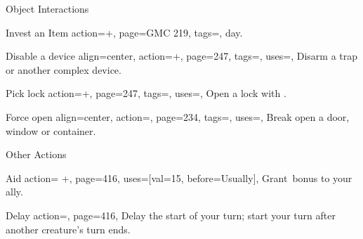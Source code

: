 \begin{PageBack}
\begin{Tables}{\backTableHeight}
\begin{Table}{Object Interactions}
\begin{entry}{Invest an Item}{%
                action=+,
                page=GMC 219,
                tags=\Manipulate,
            }
{                day.}
            \end{entry}
            \breakLine
            \begin{entry}{Disable a device}{%
                align=center,
                action=+,
                page=247,
                tags=\Manipulate,
                uses={\Thievery[tags={T}]},
            }
                Disarm a trap or another complex device. \hfill {}\\
                \hfill {}
            \end{entry}
            \begin{entry}{Pick lock}{%
                action=+,
                page=247,
                tags=\Manipulate,
                uses={\Thievery[tags={T}]},
            }
                Open a lock with . \hfill{}\; 
            \end{entry}
            \begin{entry}{Force open}{%
                align=center,
                action=,
                page=234,
                tags=\Attack,
                uses=\Athletics,
            }
                Break open a door, window or container. \hfill{}\\
                \hfill{}
            \end{entry}
        \end{Table}%
        \TableSpace
        \begin{Table}{Other Actions}
            \begin{entry}{Aid}{%
                action= +,
                page=416,
                uses={[val=15, before=Usually]},
            }
                Grant \,\Cirm bonus to your ally. \hfill {}\quad{}
            \end{entry}
            \begin{entry}{Delay}{%
                action=,
                page=416,
            }
                Delay the start of your turn; start your turn after another creature's turn ends.

\end{entry}
\end{Table}
\end{Tables}
\end{PageBack}
